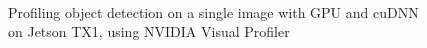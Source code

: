 \begin{figure}[t]
	\begin{center}
	 \\

	\caption{Profiling object detection on a single image with GPU and cuDNN on Jetson TX1, using NVIDIA Visual Profiler}
	\label{fig:profile}
	\end{center}
\end{figure}


